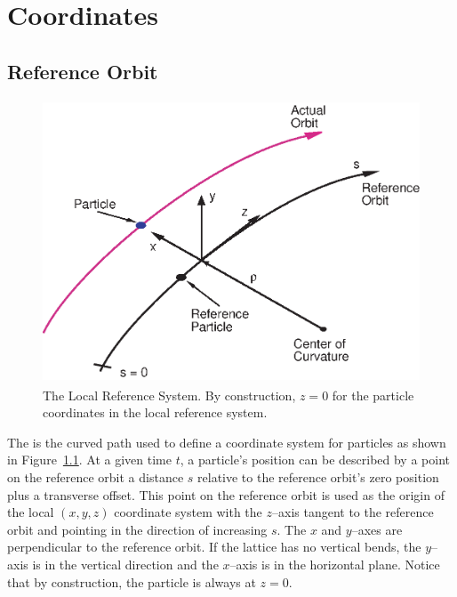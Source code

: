 \chapter{Coordinates}

\section{Reference Orbit}
\label{s:ref}

\begin{figure}[!b]
\centering
\includegraphics[height=8.4cm]{local_coords.eps}
\caption[The Local Reference System.]
{The Local Reference System. By construction, $z = 0$ for
the particle coordinates in the local reference system.}
\label{f:local_coords}
\end{figure}

The  is the curved path used to define a coordinate
system for particles as shown in Figure~\ref{f:local_coords}.  At a
given time $t$, a particle's position can be described by a point on
the reference orbit a distance $s$ relative to the reference orbit's
zero position plus a transverse offset. This point on the reference
orbit is used as the origin of the local $(x, y, z)$ coordinate system
with the $z$--axis tangent to the reference orbit and pointing in the
direction of increasing $s$. The $x$ and $y$--axes are
perpendicular to the reference orbit. If the lattice has no vertical
bends, the $y$--axis is in the vertical direction and the $x$--axis is
in the horizontal plane. Notice that by construction, the particle is
always at $z = 0$.


